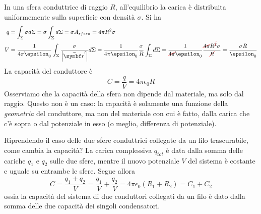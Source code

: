 \begin{examplewt}
	In una sfera conduttrice di raggio $R$, all'equilibrio la carica è distribuita uniformemente sulla superficie con densità $\sigma$. Si ha
	\begin{align*}
		q&=\int_{\Sigma}\sigma d\Sigma=\sigma\int_{\Sigma}d\Sigma=\sigma A_{sfera}=4\pi R^2 \sigma\\
		V&=\frac{1}{4\pi\epsilon_0}\int_{\Sigma}\frac{\sigma}{\abs{\vba{r}'}}d\Sigma=\frac{1}{4\pi\epsilon_0}\frac{\sigma}{R}\int_{\Sigma}d\Sigma=\frac{1}{\Ccancel[red]{4\pi}\epsilon_0}\frac{\Ccancel[red]{4\pi} R^{\Ccancel[red]{2}} \sigma}{\Ccancel[red]{R}}=\frac{\sigma R}{\epsilon_0}
	\end{align*}
La capacità del conduttore è
\begin{equation}
	C=\frac{q}{V}=4\pi \epsilon_0 R
\end{equation}
Osserviamo che la capacità della sfera non dipende dal materiale, ma solo dal raggio. Questo non è un caso: la capacità è solamente una funzione della \textit{geometria} del conduttore, ma non del materiale con cui è fatto, dalla carica che c'è sopra o dal potenziale in esso (o meglio, differenza di potenziale).
\end{examplewt}
\begin{example}
	Riprendendo il caso delle due sfere conduttrici collegate da un filo trascurabile, come cambia la capacità? La carica complessiva $q_{tot}$ è data dalla somma delle cariche $q_1$ e $q_2$  sulle due sfere, mentre il nuovo potenziale $V$ del sistema è costante e uguale su entrambe le sfere. Segue allora
	\begin{equation}
		C=\frac{q_1+q_2}{V}=\frac{q_1}{V}+\frac{q_2}{V}=4\pi\epsilon_0\left(R_1+R_2\right)=C_1+C_2
	\end{equation} 
	ossia la capacità del sistema di due conduttori collegati da un filo è dato dalla somma delle due capacità dei singoli condensatori.
\end{example}
